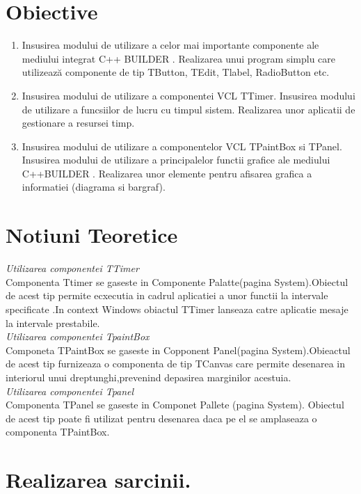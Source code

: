 \documentclass[11pt]{article}
\begin{document}
\section{Obiective}
\begin{enumerate}
\item Insusirea modului de utilizare a celor mai importante componente ale mediului integrat C++ BUILDER . Realizarea unui program simplu care utilizează componente de tip TButton, TEdit, Tlabel, RadioButton  etc.
\item Insusirea modului de utilizare a componentei VCL TTimer. Insusirea modului de utilizare a funcsiilor de lucru cu timpul sistem. Realizarea unor aplicatii de gestionare a resursei timp. 
\item Insusirea modului de utilizare a componentelor VCL  TPaintBox si TPanel. Insusirea modului de utilizare a principalelor functii grafice ale mediului C++BUILDER . Realizarea unor elemente pentru  afisarea grafica a informatiei (diagrama si bargraf).  
 
\end{enumerate}
\section{Notiuni Teoretice}
\textit{Utilizarea componentei TTimer}\\[0.3 cm]
 Componenta Ttimer se gaseste in Componente Palatte(pagina System).Obiectul de acest tip permite ecxecutia in cadrul aplicatiei a unor functii la intervale specificate .In context Windows obiactul TTimer lanseaza catre aplicatie mesaje la intervale prestabile.\\[0.3 cm]
 
 \textit{Utilizarea componentei TpaintBox}\\[0.3 cm]
 Componeta TPaintBox se gaseste in Copponent Panel(pagina System).Obieactul de acest tip furnizeaza o componenta de tip TCanvas care permite desenarea in interiorul unui dreptunghi,prevenind depasirea marginilor acestuia.\\[0.3 cm]
 
 \textit{Utilizarea componentei Tpanel}\\[0.3 cm]
 Componenta TPanel se gaseste in Componet Pallete (pagina System).
 Obiectul de acest tip poate fi utilizat pentru desenarea daca pe el se amplaseaza o componenta TPaintBox.\\[0.3 cm]
 
 
   \section{Realizarea sarcinii.}
 
\end{document}
